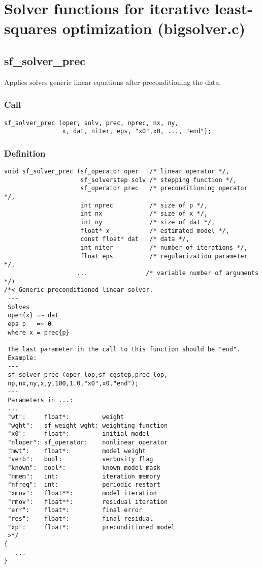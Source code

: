 \section{Solver functions for iterative least-squares optimization (bigsolver.c)}




\subsection{{sf\_solver\_prec}}
Applies solves generic linear equations after preconditioning the data.

\subsubsection*{Call}
\begin{verbatim}
sf_solver_prec (oper, solv, prec, nprec, nx, ny, 
                x, dat, niter, eps, "x0",x0, ..., "end");
\end{verbatim}

\subsubsection*{Definition}
\begin{verbatim}
void sf_solver_prec (sf_operator oper   /* linear operator */, 
                     sf_solverstep solv /* stepping function */, 
                     sf_operator prec   /* preconditioning operator */, 
                     int nprec          /* size of p */, 
                     int nx             /* size of x */, 
                     int ny             /* size of dat */, 
                     float* x           /* estimated model */, 
                     const float* dat   /* data */, 
                     int niter          /* number of iterations */, 
                     float eps          /* regularization parameter */, 
                    ...                /* variable number of arguments */) 
/*< Generic preconditioned linear solver.
 ---
 Solves
 oper{x} =~ dat
 eps p   =~ 0
 where x = prec{p}
 ---
 The last parameter in the call to this function should be "end".
 Example: 
 ---
 sf_solver_prec (oper_lop,sf_cgstep,prec_lop,
 np,nx,ny,x,y,100,1.0,"x0",x0,"end");
 ---
 Parameters in ...:
 ... 
 "wt":     float*:         weight      
 "wght":   sf_weight wght: weighting function
 "x0":     float*:         initial model
 "nloper": sf_operator:    nonlinear operator  
 "mwt":    float*:         model weight
 "verb":   bool:           verbosity flag
 "known":  bool*:          known model mask
 "nmem":   int:            iteration memory
 "nfreq":  int:            periodic restart
 "xmov":   float**:        model iteration
 "rmov":   float**:        residual iteration
 "err":    float*:         final error
 "res":    float*:         final residual
 "xp":     float*:         preconditioned model
 >*/
{
   ...
}
\end{verbatim}

